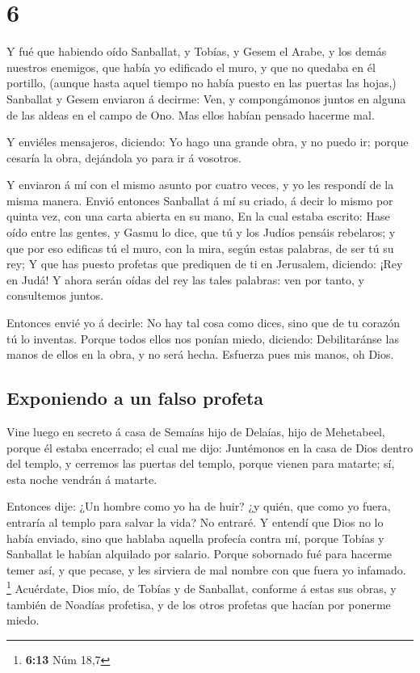 \hypertarget{section-5}{%
\section{6}\label{section-5}}

 Y fué que habiendo oído Sanballat, y Tobías, y Gesem el
Arabe, y los demás nuestros enemigos, que había yo edificado el muro, y
que no quedaba en él portillo, (aunque hasta aquel tiempo no había
puesto en las puertas las hojas,)  Sanballat y Gesem
enviaron á decirme: Ven, y compongámonos juntos en alguna de las aldeas
en el campo de Ono. Mas ellos habían pensado hacerme mal.

 Y enviéles mensajeros, diciendo: Yo hago una grande obra, y
no puedo ir; porque cesaría la obra, dejándola yo para ir á vosotros.

 Y enviaron á mí con el mismo asunto por cuatro veces, y yo
les respondí de la misma manera.  Envió entonces Sanballat á
mí su criado, á decir lo mismo por quinta vez, con una carta abierta en
su mano,  En la cual estaba escrito: Hase oído entre las
gentes, y Gasmu lo dice, que tú y los Judíos pensáis rebelaros; y que
por eso edificas tú el muro, con la mira, según estas palabras, de ser
tú su rey;  Y que has puesto profetas que prediquen de ti en
Jerusalem, diciendo: ¡Rey en Judá! Y ahora serán oídas del rey las tales
palabras: ven por tanto, y consultemos juntos.

 Entonces envié yo á decirle: No hay tal cosa como dices,
sino que de tu corazón tú lo inventas.  Porque todos ellos
nos ponían miedo, diciendo: Debilitaránse las manos de ellos en la obra,
y no será hecha. Esfuerza pues mis manos, oh Dios.

\hypertarget{exponiendo-a-un-falso-profeta}{%
\subsection{Exponiendo a un falso
profeta}\label{exponiendo-a-un-falso-profeta}}

 Vine luego en secreto á casa de Semaías hijo de Delaías,
hijo de Mehetabeel, porque él estaba encerrado; el cual me dijo:
Juntémonos en la casa de Dios dentro del templo, y cerremos las puertas
del templo, porque vienen para matarte; sí, esta noche vendrán á
matarte.

 Entonces dije: ¿Un hombre como yo ha de huir? ¿y quién,
que como yo fuera, entraría al templo para salvar la vida? No entraré.
 Y entendí que Dios no lo había enviado, sino que hablaba
aquella profecía contra mí, porque Tobías y Sanballat le habían
alquilado por salario.  Porque sobornado fué para hacerme
temer así, y que pecase, y les sirviera de mal nombre con que fuera yo
infamado. \footnote{\textbf{6:13} Núm 18,7}  Acuérdate,
Dios mío, de Tobías y de Sanballat, conforme á estas sus obras, y
también de Noadías profetisa, y de los otros profetas que hacían por
ponerme miedo.

